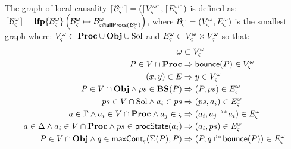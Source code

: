 \begin{comment}
The reachability of a process $a_i$ is approximated by the ability to solve all objectives $\PHobjp{a}{j}{i}$ for all $a_j$ in the initial context.
To this end, the abstractions of bounce sequences (\pref{def:aBS}) solving these objectives are computed, leading to new required processes, and thus new objectives on other sorts.
Thus, the graph of local causality $\cwB = (\V, \E)$ defined in \pref{def:glc} is a graph where $\V \subset \Proc \cup \Obj \cup \Sol$ and $\E \subset \V \times \V$
in which edges link any required process $a_i$ in $\Proc$ to all corresponding objectives $P$ in $\Obj$,
and any objective $P$ to abstractions of bounce sequences $ps \in \Sol$ (\pref{def:aBS}) solving this objective;
such sets $ps$ then stand for new required processes.
In the case where a process $a_i$ belongs to a cooperative sort, it is directly linked to the set of the processes $\csState(a_i)$ (\pref{def:csState}) that it represents.
If the solving of an objective $P$ requires a process of $\PHsort(P)$, a continuity edge is added to re-target this objective (\pref{def:maxCont}).
Finally, as the active process of every sort may evolve, $\cwB$ is obtained iteratively by saturation with every process it contains,
\ie by overriding its initial context $\ctx$ by $\allprocs(\V, \E)$, defined by:
$$\allprocs(\V, \E) = (V \cap \Proc) \cup \{ \PHtarget(P), \PHbounce(P) \mid P \in \V \cap \Obj \}$$
\end{comment}

\begin{definition}
\label{def:glc}
  The graph of local causality $\lceil \mathcal{B}_\varsigma^\omega\rceil = (\lceil V_\varsigma^\omega\rceil, \lceil E_\varsigma^\omega\rceil)$ is defined as: $\lceil \mathcal{B}_\varsigma^\omega\rceil = \mathbf{lfp}\{\mathcal{B}^\omega_\varsigma\}\left(\mathcal{B}^\omega_\varsigma\mapsto\mathcal{B}^\omega_{\varsigma \Cap \mathsf{allProcs}(\mathcal{B}^\omega_\varsigma)}\right)$,
  where $\mathcal{B}^\omega_\varsigma = (V_\varsigma^\omega, E_\varsigma^\omega)$ is the smallest graph where:
  $V_\varsigma^\omega \subset \mathbf{Proc} \cup \mathbf{Obj} \cup \mathrm{Sol}$ and $E_\varsigma^\omega \subset V_\varsigma^\omega \times V_\varsigma^\omega$
  so that:
  \begin{align}
    \omega &\subset V_\varsigma^\omega \label{eq:Vw} \\
    P \in V \cap \mathbf{Proc} &\Rightarrow \mathsf{bounce}(P) \in V_\varsigma^\omega \label{eq:Vproc} \\
    (x, y) \in E &\Rightarrow y \in V_\varsigma^\omega \label{eq:VE} \\
    P \in V \cap \mathbf{Obj} \wedge ps \in \mathbf{BS}(P) &\Rightarrow (P, ps) \in E_\varsigma^\omega \label{eq:ESol1} \\
    ps \in V \cap \mathrm{Sol} \wedge a_i \in ps &\Rightarrow (ps, a_i) \in E_\varsigma^\omega \label{eq:ESol2} \\
    a \in \Gamma \wedge a_i \in V \cap \mathbf{Proc} \wedge a_j \in \varsigma &\Rightarrow (a_i, \mbox{${a}_{j}\Rsh^*\!{a}_{i}$}) \in E_\varsigma^\omega \label{eq:EReq} \\
    a \in \Delta \wedge a_i \in V \cap \mathbf{Proc} \wedge ps \in \mathsf{procState}(a_i) &\Rightarrow (a_i, ps) \in E_\varsigma^\omega \label{eq:EPrio} \\
    P \in V \cap \mathbf{Obj} \wedge q \in \mathsf{maxCont}_\varsigma(\Sigma(P), P) &\Rightarrow (P, \mbox{$q\Rsh^*\!\mathsf{bounce}(P)$}) \in E_\varsigma^\omega \label{eq:ECont}
  \end{align}
\end{definition}

